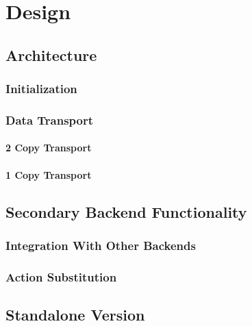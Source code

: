 
\chapter{Design}\label{chapter:design}


\section{Architecture}


\subsection{Initialization}



\subsection{Data Transport}


\subsubsection{2 Copy Transport}


\subsubsection{1 Copy Transport}



\section{Secondary Backend Functionality}


\subsection{Integration With Other Backends}


\subsection{Action Substitution}



\section{Standalone Version}

